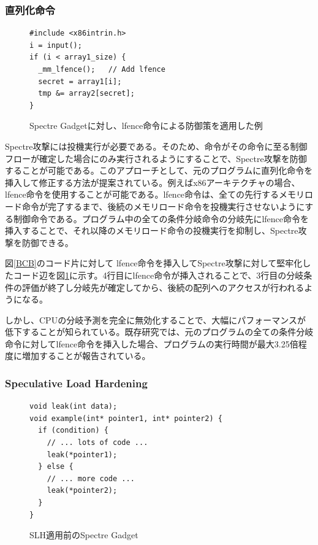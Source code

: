 \subsubsection{直列化命令}

\begin{figure}
  \begin{verbatim}
#include <x86intrin.h>
i = input();
if (i < array1_size) {
  _mm_lfence();   // Add lfence
  secret = array1[i];  
  tmp &= array2[secret];  
}
\end{verbatim}
  \caption{Spectre Gadgetに対し、lfence命令による防御策を適用した例}
  \label{lfence}
\end{figure}

Spectre攻撃には投機実行が必要である。そのため、命令がその命令に至る制御フローが確定した場合にのみ実行されるようにすることで、Spectre攻撃を防御することが可能である。このアプローチとして、元のプログラムに直列化命令を挿入して修正する方法が提案されている\cite{8835233}。例えばx86アーキテクチャの場合、lfence命令を使用することが可能である。lfence命令は、全ての先行するメモリロード命令が完了するまで、後続のメモリロード命令を投機実行させないようにする制御命令である。プログラム中の全ての条件分岐命令の分岐先にlfence命令を挿入することで、それ以降のメモリロード命令の投機実行を抑制し、Spectre攻撃を防御できる。\par

図\ref{BCB}のコード片に対して lfence命令を挿入してSpectre攻撃に対して堅牢化したコード辺を図\ref{lfence}に示す。4行目にlfence命令が挿入されることで、3行目の分岐条件の評価が終了し分岐先が確定してから、後続の配列へのアクセスが行われるようになる。\par 
しかし、CPUの分岐予測を完全に無効化することで、大幅にパフォーマンスが低下することが知られている。既存研究\cite{wang2018oo7}では、元のプログラムの全ての条件分岐命令に対してlfence命令を挿入した場合、プログラムの実行時間が最大3.25倍程度に増加することが報告されている。

\subsubsection{Speculative Load Hardening}

\begin{figure}
  \begin{verbatim}
void leak(int data);
void example(int* pointer1, int* pointer2) {
  if (condition) {
    // ... lots of code ...
    leak(*pointer1);
  } else {
    // ... more code ...
    leak(*pointer2);
  }
}
\end{verbatim}
  \caption{SLH適用前のSpectre Gadget}
  \label{SLH_before}
\end{figure}


